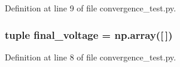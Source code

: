 Definition at line 9 of file convergence\-\_\-test.\-py.

\hypertarget{namespaceconvergence__test_aec622a0e4663d49d3f8ceee22ccbdbcd}{
\subsubsection[{final\-\_\-voltage}]{\setlength{\rightskip}{0pt plus 5cm}tuple final\-\_\-voltage = np.\-array(\mbox{[}$\,$\mbox{]})}}\label{namespaceconvergence__test_aec622a0e4663d49d3f8ceee22ccbdbcd}


Definition at line 8 of file convergence\-\_\-test.\-py.


